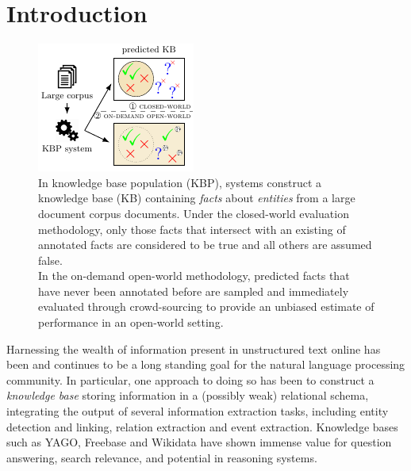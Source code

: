\section{Introduction}
\label{sec:intro}

\begin{figure}[t]
  \includegraphics[width=\columnwidth]{figures/overview}
  \caption{\label{fig:task}
  In knowledge base population (KBP), systems construct a knowledge base (KB) containing \textit{facts} about \textit{entities} 
  from a large document corpus documents.
  Under the closed-world evaluation methodology, only those facts that intersect with an existing of annotated facts
  are considered to be true and all others are assumed false.
  \\
  In the on-demand open-world methodology, predicted facts that have never been annotated before are sampled and immediately evaluated through crowd-sourcing to provide an unbiased estimate of performance in an open-world setting.
  }
\end{figure}

Harnessing the wealth of information present in unstructured text online has been and continues to be a long standing goal for the natural language processing community.
In particular, one approach to doing so has been to construct a \textit{knowledge base} storing information in a (possibly weak) relational schema, integrating the output of several information extraction tasks, including entity detection and linking, relation extraction and event extraction.
Knowledge bases such as YAGO, Freebase and Wikidata have shown immense value for question answering, search relevance, and potential in reasoning systems\needcite.

